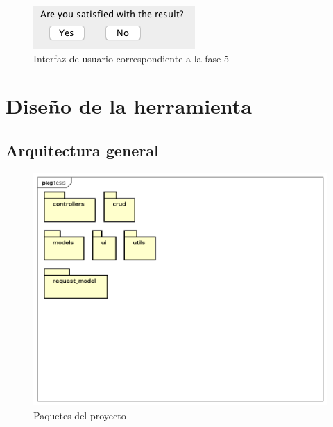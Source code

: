 \begin{figure}[!h] 
	\begin{center}
		\includegraphics [scale=1.00]{imagenes/Interfaz_de_usuario_satisfecho.png}
	\end{center}
	\caption{Interfaz de usuario correspondiente a la fase 5}
	\label{fig:Interfaz de usuario correspondiente a la fase 5}
\end{figure} 






\section{Diseño de la herramienta}

\subsection{Arquitectura general}

\begin{figure}[!h] 
	\begin{center}
		\includegraphics [scale=0.70]{imagenes/paquetes.png}
	\end{center}
	\caption{Paquetes del proyecto}
	\label{fig:Paquetes del proyecto}
\end{figure} 

